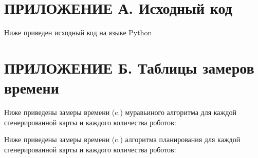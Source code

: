 \documentclass{article}
\begin{document}
    \newpage
	\section*{ПРИЛОЖЕНИЕ А. Исходный код} \label{sec:code}
	Ниже приведен исходный код на языке Python
	
	
	
	
	


    \newpage
	\section*{ПРИЛОЖЕНИЕ Б. Таблицы замеров времени} \label{sec:time}
	Ниже приведены замеры времени (c.) муравьиного алгоритма для каждой сгенерированной карты и каждого количества роботов:

	
	
	
	
	
	

	Ниже приведены замеры времени (c.) алгоритма планирования для каждой сгенерированной карты и каждого количества роботов:

	
	
	
	
	
	

    \newpage
\end{document}
